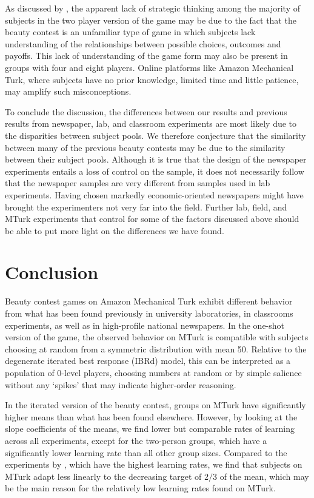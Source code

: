 \documentclass[12pt,review]{elsarticle}
\begin{document}
As discussed by \citet{chou2009control}, the apparent lack of strategic thinking among the majority of subjects in the two player version of the game may be due to the fact that the beauty contest is an unfamiliar type of game in which subjects lack understanding of the relationships between possible choices, outcomes and payoffs. This lack of understanding of the game form may also be present in groups with four and eight players. Online platforms like Amazon Mechanical Turk, where subjects have no prior knowledge, limited time and little patience, may amplify such misconceptions.

To conclude the discussion, the differences between our results and previous results from newspaper, lab, and classroom experiments are most likely due to the disparities between subject pools. We therefore conjecture that the similarity between many of the previous beauty contests may be due to the similarity between their subject pools. Although it is true that the design of the newspaper experiments entails a loss of control on the sample, it does not necessarily follow that the newspaper samples are very different from samples used in lab experiments. Having chosen markedly economic-oriented newspapers might have brought the experimenters not very far into the field. Further lab, field, and MTurk experiments that control for some of the factors discussed above should be able to put more light on the differences we have found.

\section{Conclusion\label{sec:Conclusion}}
\noindent
Beauty contest games on Amazon Mechanical Turk exhibit different behavior from what has been found previously in university laboratories, in classrooms experiments, as well as in high-profile national newspapers. In the one-shot version of the game, the observed behavior on MTurk is compatible with subjects choosing at random from a symmetric distribution with mean 50. Relative to the degenerate iterated best response (IBRd) model, this can be interpreted as a population of 0-level players, choosing numbers at random or by simple salience without any `spikes' that may indicate higher-order reasoning. 

In the iterated version of the beauty contest, groups on MTurk have significantly higher means than what has been found elsewhere. However, by looking at the slope coefficients of the means, we find lower but comparable rates of learning across all experiments, except for the two-person groups, which have a significantly lower learning rate than all other group sizes. Compared to the experiments by \citet{Nagel95}, which have the highest learning rates, we find that subjects on MTurk adapt less linearly to the decreasing target of $2/3$ of the mean, which may be the main reason for the relatively low learning rates found on MTurk.
\end{document}
